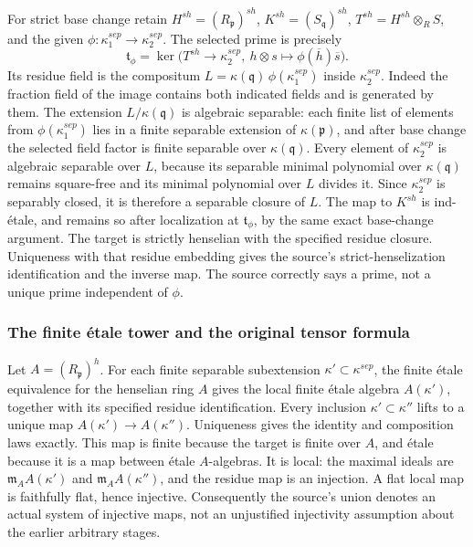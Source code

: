 For strict base change retain \(H^{sh}=(R_{\mathfrak p})^{sh}\), \(K^{sh}=(S_{\mathfrak q})^{sh}\), \(T^{sh}=H^{sh}\otimes_R S\), and the given \(\phi:\kappa_1^{sep}\to\kappa_2^{sep}\). The selected prime is precisely \[
 \mathfrak t_\phi=\ker\bigl(T^{sh}\longrightarrow\kappa_2^{sep},
            \ h\otimes s\longmapsto\phi(\overline h)\overline s\bigr).
\] Its residue field is the compositum \(L=\kappa(\mathfrak q)\,\phi(\kappa_1^{sep})\) inside \(\kappa_2^{sep}\). Indeed the fraction field of the image contains both indicated fields and is generated by them. The extension \(L/\kappa(\mathfrak q)\) is algebraic separable: each finite list of elements from \(\phi(\kappa_1^{sep})\) lies in a finite separable extension of \(\kappa(\mathfrak p)\), and after base change the selected field factor is finite separable over \(\kappa(\mathfrak q)\). Every element of \(\kappa_2^{sep}\) is algebraic separable over \(L\), because its separable minimal polynomial over \(\kappa(\mathfrak q)\) remains square-free and its minimal polynomial over \(L\) divides it. Since \(\kappa_2^{sep}\) is separably closed, it is therefore a separable closure of \(L\). The map to \(K^{sh}\) is ind-étale, and remains so after localization at \(\mathfrak t_\phi\), by the same exact base-change argument. The target is strictly henselian with the specified residue closure. Uniqueness with that residue embedding gives the source's strict-henselization identification and the inverse map. The source correctly says a prime, not a unique prime independent of \(\phi\).

\subsubsection{The finite étale tower and the original tensor formula}\label{the-finite-uxe9tale-tower-and-the-original-tensor-formula}

Let \(A=(R_{\mathfrak p})^h\). For each finite separable subextension \(\kappa'\subset\kappa^{sep}\), the finite étale equivalence for the henselian ring \(A\) gives the local finite étale algebra \(A(\kappa')\), together with its specified residue identification. Every inclusion \(\kappa'\subset\kappa''\) lifts to a unique map \(A(\kappa')\to A(\kappa'')\). Uniqueness gives the identity and composition laws exactly. This map is finite because the target is finite over \(A\), and étale because it is a map between étale \(A\)-algebras. It is local: the maximal ideals are \(\mathfrak m_A A(\kappa')\) and \(\mathfrak m_A A(\kappa'')\), and the residue map is an injection. A flat local map is faithfully flat, hence injective. Consequently the source's union denotes an actual system of injective maps, not an unjustified injectivity assumption about the earlier arbitrary stages.


